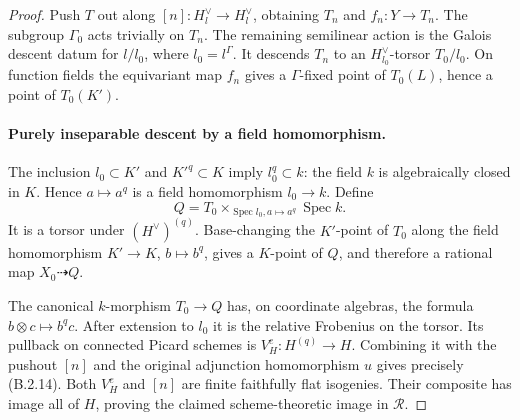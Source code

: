 \begin{proof}
Push $T$ out along $[n]:H_l^\vee\to H_l^\vee$, obtaining
$T_n$ and $f_n:Y\to T_n$.  The subgroup $\Gamma_0$ acts
trivially on $T_n$.  The remaining semilinear action is the
Galois descent datum for $l/l_0$, where $l_0=l^\Gamma$.
It descends $T_n$ to an $H^\vee_{l_0}$-torsor $T_0/l_0$.
On function fields the equivariant map $f_n$ gives a
$\Gamma$-fixed point of $T_0(L)$, hence a point of $T_0(K')$.

\paragraph{Purely inseparable descent by a field homomorphism.}
The inclusion $l_0\subset K'$ and $K'^q\subset K$ imply
$l_0^q\subset k$: the field $k$ is algebraically closed in
$K$.  Hence $a\mapsto a^q$ is a field homomorphism
$l_0\to k$.  Define
\[
 Q=T_0\times_{\operatorname{Spec}l_0, a\mapsto a^q}
                   \operatorname{Spec}k.
\]
It is a torsor under $(H^\vee)^{(q)}$.
Base-changing the $K'$-point of $T_0$ along the field
homomorphism $K'\to K$, $b\mapsto b^q$, gives a $K$-point
of $Q$, and therefore a rational map $X_0\dashrightarrow Q$.

The canonical $k$-morphism $T_0\to Q$ has, on coordinate
algebras, the formula $b\otimes c\mapsto b^q c$.
After extension to $l_0$ it is the relative Frobenius on the
torsor.  Its pullback on connected Picard schemes is
$V_H^e:H^{(q)}\to H$.  Combining it with the pushout $[n]$
and the original adjunction homomorphism $u$ gives precisely
(B.2.14).  Both $V_H^e$ and $[n]$ are finite faithfully flat
isogenies.  Their composite has image all of $H$, proving
the claimed scheme-theoretic image in $\mathcal R$.
\end{proof}

